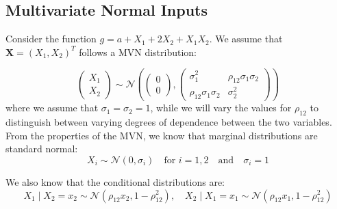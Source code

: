 \subsection{Multivariate Normal Inputs}

Consider the function \(g = a + X_1 + 2X_2 + X_1 X_2\). We assume that $\boldsymbol{X} = (X_1, X_2)^T$ follows a MVN distribution:

\[
\begin{pmatrix}
X_1 \\
X_2
\end{pmatrix}
\sim \mathcal{N}\left(
\begin{pmatrix} 0 \\ 0 \end{pmatrix},
\begin{pmatrix}
\sigma_1^2 & \rho_{12}\sigma_1 \sigma_2 \\
\rho_{12}\sigma_1 \sigma_2  & \sigma_2^2
\end{pmatrix}
\right)
\]
where we assume that $\sigma_1 = \sigma_2 = 1$, while we will vary the values for $\rho_{12}$ to distinguish between varying degrees of dependence between the two variables.
From the properties of the MVN, we know that marginal distributions are standard normal:
\[
X_i \sim \mathcal{N}(0, \sigma_i) \quad \text{for } i = 1, 2 \quad \text{and} \quad \sigma_i = 1
\]

We also know that the conditional distributions are:
\[
X_1 \mid X_2 = x_2 \sim \mathcal{N}(\rho_{12} x_2, 1 - \rho_{12}^2), \quad
X_2 \mid X_1 = x_1 \sim \mathcal{N}(\rho_{12} x_1, 1 - \rho_{12}^2)
\]


